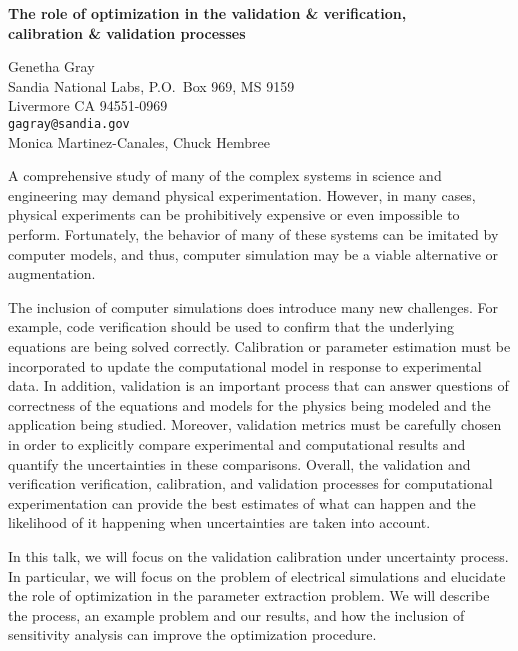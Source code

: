 \documentclass[twosided]{report}
\begin{document}
\begin{center}
{\large			%
{\bf The role of optimization in the validation \& verification, \\
calibration \& validation processes}}

	Genetha Gray \\
	Sandia National Labs, P.O.~Box 969, MS 9159 \\
	Livermore CA 94551-0969 \\
	{\tt gagray@sandia.gov} \\
	Monica Martinez-Canales, Chuck Hembree
\end{center}
A comprehensive study of many of the complex systems in
science and engineering may demand physical experimentation.
However, in many cases, physical experiments can be
prohibitively expensive or even impossible to perform.
Fortunately, the behavior of many of these systems can be
imitated by computer models, and thus, computer simulation
may be a viable alternative or augmentation.

 The
inclusion of computer simulations does introduce many new
challenges. For example, code verification should be used to
confirm that the underlying equations are being solved
correctly. Calibration or parameter estimation must be
incorporated to update the computational model in response
to experimental data. In addition, validation is an
important process that can answer questions of correctness
of the equations and models for the physics being modeled
and the application being studied. Moreover, validation
metrics must be carefully chosen in order to explicitly
compare experimental and computational results and quantify
the uncertainties in these comparisons. Overall, the
validation and verification verification, calibration, and
validation processes for computational experimentation can
provide the best estimates of what can happen and the
likelihood of it happening when uncertainties are taken into
account.

 In this talk, we will focus on the validation
calibration under uncertainty process. In particular, we
will focus on the problem of electrical simulations and
elucidate the role of optimization in the parameter
extraction problem. We will describe the process, an example
problem and our results, and how the inclusion of
sensitivity analysis can improve the optimization procedure.
\end{document}
